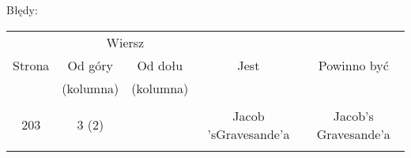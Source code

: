 \documentclass[a4paper,11pt]{article}
\begin{document}
Błędy:\\
\begin{center}
  \begin{tabular}{|c|c|c|c|c|}
    \hline
      & \multicolumn{2}{c|}{Wiersz} & & \\ \cline{2-3}
    Strona & Od góry & Od dołu & Jest & Powinno być \\ 
      & (kolumna) & (kolumna) & & \\ \hline
      & & & & \\
    203 & 3 (2) & & Jacob 'sGravesande'a & Jacob's Gravesande'a \\
      & & & & \\ \hline
  \end{tabular}
\end{center}


 {}
\end{document}
